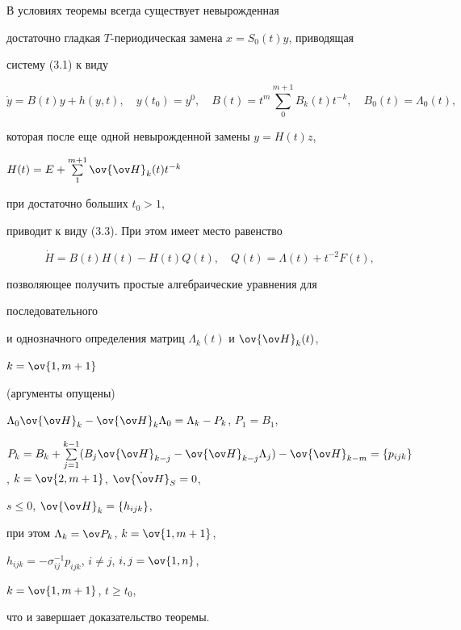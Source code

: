  


\begin{pf} 


В условиях теоремы всегда существует невырожденная  


достаточно гладкая $T$-периодическая замена $x=S_0(t)y$, приводящая 


систему (3.1) к виду 


$$ 


\Dot y=B(t)y+h(y,t),\quad y(t_0)=y^0,\quad 


B(t)=t^m\sum^{m+1}_0B_k(t)t^{-k},\quad B_0(t)=\Lambda_0(t), 


$$ 


которая после еще одной невырожденной замены $y=H(t)z$, 


$H(t)=E+\sum\limits^{m+1}_1\ov{\ov H}_k(t)t^{-k}$ 


при достаточно больших $t_0>1$,


приводит к виду (3.3). При этом имеет место равенство 


$$ 


\Dot H=B(t)H(t)-H(t)Q(t),\quad Q(t)=\Lambda(t)+t^{-2}F(t), 


$$ 


позволяющее получить простые алгебраические уравнения для 


последовательного 


и однозначного определения матриц $\Lambda_k(t)$ и $\ov{\ov H}_k(t)$, 


$k=\ov{1,m+1}$ 


(аргументы опущены) 


$\Lambda_0\ov{\ov H}_k-\ov{\ov H}_k\Lambda_0=\Lambda_k-P_k$, $P_1=B_1$, 


$P_k=B_k+\sum\limits^{k-1}_{j=1}(B_j \ov{\ov H}_{k-j}-


\ov{\ov H}_{k-j}\Lambda_j)- 


\ov{\ov H}_{k-m}=\{p_{i j k}\}$, $k=\ov{2,m+1}$, $\Dot{\ov{\ov H}}_S=0$, 


$s\le0$, $\ov{\ov H}_k=\{h_{i j k}\}$,


при этом $\Lambda_k=\ov P_k$, $k=\ov{1,m+1}$, 


$h_{i j k}=-\sigma^{-1}_{i j}p_{i j k}$, $i\ne j$, $i,j=\ov{1,n}$, 


$k=\ov{1,m+1}$, $t\ge t_0$,


что и завершает доказательство теоремы. 


\end{pf} 


